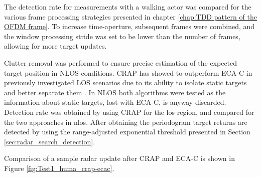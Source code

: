 The detection rate for measurements with a walking actor was compared for the various frame processing strategies presented in chapter \ref{chap:TDD pattern of the OFDM frame}. To increase time-aperture, subsequent frames were combined, and the window processing stride was set to be lower than the number 
of frames, allowing for more target updates.

Clutter removal was performed to ensure precise estimation of the expected target position in NLOS conditions. 
CRAP has showed to outperform ECA-C in previously investigated LOS scenarios due to its ability to isolate static targets and better separate them \cite{Henninger_CRAP_2023}.
In NLOS both algorithms were tested as the information about static targets, lost with ECA-C, is anyway discarded.
Detection rate was obtained by using CRAP for the \gls{los} region, and compared for the two approaches in \gls{nlos}.
After obtaining the periodogram target returns are detected by using the range-adjusted exponential threshold presented in Section \ref{sec:radar_search_detection}.

Comparison of a sample radar update after CRAP and ECA-C is shown in Figure \ref{fig:Test1_huma_crap-ecac}.

